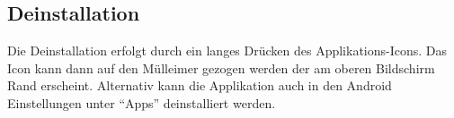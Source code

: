 \subsection{Deinstallation}
Die Deinstallation erfolgt durch ein langes Drücken des Applikations-Icons. Das Icon kann dann auf den Mülleimer gezogen werden der am oberen Bildschirm Rand erscheint. Alternativ kann die Applikation auch in den Android Einstellungen unter \enquote{Apps} deinstalliert werden.